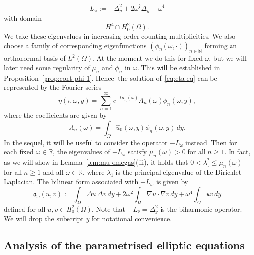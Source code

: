 \documentclass[a4paper, reqno]{amsart}
\numberwithin{equation}{section}
\theoremstyle{plain}
\theoremstyle{definition}
\theoremstyle{remark}
\newcommand{\mfra}{\mathfrak{a}}
\newcommand{\NN}{\mathbb{N}}
\newcommand{\RR}{\mathbb{R}}
\begin{document}
\begin{equation}
  \label{eq:L-omega}
  L_\omega := -\Delta_y^2 +2 \omega^2 \Delta_y - \omega^4
\end{equation}
with domain
\begin{equation*}
  H^4 \cap H^2_0(\Omega).
\end{equation*}
We take these eigenvalues in increasing order counting multiplicities. We also choose a family of corresponding eigenfunctions $(\phi_n(\omega, \cdot))_{n \in \NN}$ forming an orthonormal basis of $L^2(\Omega)$. At the moment we do this for fixed $\omega$, but we will later need some regularity of $\mu_n$ and $\phi_n$ in $\omega$. This will be established in Proposition~\ref{prop:cont-phi-1}. Hence, the solution of~\eqref{eq:eta-eq} can be represented by the Fourier series
\begin{equation}
  \label{eq:eta-Fourier-series}
  \eta(t, \omega, y) = \sum_{n=1}^\infty e^{-t \mu_n(\omega)} A_n(\omega) \phi_n(\omega, y),
\end{equation}
where the coefficients are given by
\begin{equation}
  \label{eq:An}
  A_n(\omega) = \int_\Omega \widehat{u}_0(\omega,y) \phi_n(\omega, y) \,dy.
\end{equation}
In the sequel, it will be useful to consider the operator $-L_\omega$ instead. Then for each fixed $\omega \in \RR$, the eigenvalues of $-L_\omega$ satisfy $\mu_n(\omega) > 0$ for all $n \geq 1$. In fact, as we will show in Lemma~\ref{lem:mu-omegas}(iii), it holds that $0 < \lambda_1^2 \leq \mu_n(\omega)$ for all $n \ge 1$ and all $\omega \in \RR$, where $\lambda_1$ is the principal eigenvalue of the Dirichlet Laplacian. The bilinear form associated with $-L_\omega$ is given by
\begin{equation}
  \label{eq:a-omega}
  \mfra_\omega(u,v) := \int_\Omega \Delta u \, \Delta v \,dy + 2\omega^2 \int_\Omega \nabla u \cdot \nabla v \,dy + \omega^4 \int_\Omega uv \,dy
\end{equation}
defined for all $u, v \in H^2_0(\Omega)$. Note that $-L_0 = \Delta^2_y$ is the biharmonic operator. We will drop the subscript $y$ for notational convenience.

\subsection{Analysis of the parametrised elliptic equations}
\end{document}
